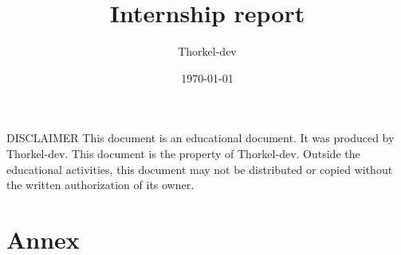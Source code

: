\documentclass[a4paper,11pt,titlepage]{article}
\author{Thorkel-dev}        %
\title{Internship report}   %
\date{\normalsize\today}    %
\begin{document}
\maketitle

\vspace*{\fill}
\noindent
DISCLAIMER \newline
This document is an educational document. It was produced by Thorkel-dev.
This document is the property of Thorkel-dev. Outside the educational activities, this document
may not be distributed or copied without the written authorization of its owner.
\vspace*{\fill}
\clearpage


\tableofcontents \label{TableOfContent} %

\clearpage


\clearpage



\part{Annex}
\printglossary[type=\acronymtype] \label{acronyms}
\glsaddallunused %

\clearpage
\printglossary[] \label{domaindictionary} %
\glsaddallunused %

\clearpage
\listoffigures \label{TableOfFigure} %

\clearpage
\listoflistings \label{TableOfCode} %

\clearpage
\printbibliography[heading=bibnumbered] \label{bibliography} %
\nocite{*} %

\clearpage
\null
\thispagestyle{empty}%
\addtocounter{page}{-1}%
\end{document}
